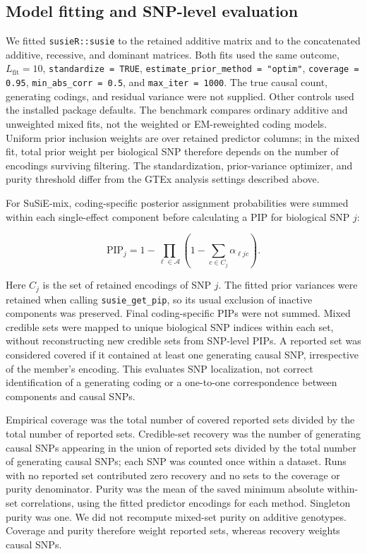 \documentclass[12pt]{article}
\begin{document}
\subsection{Model fitting and SNP-level evaluation}

We fitted \texttt{susieR::susie} to the retained additive matrix and to
the concatenated additive, recessive, and dominant matrices. Both fits
used the same outcome, $L_{\mathrm{fit}}=10$,
\texttt{standardize = TRUE}, \texttt{estimate\_prior\_method = "optim"},
\texttt{coverage = 0.95}, \texttt{min\_abs\_corr = 0.5}, and
\texttt{max\_iter = 1000}. The true causal count, generating codings,
and residual variance were not supplied. Other controls used the
installed package defaults. The benchmark compares ordinary additive
and unweighted mixed fits, not the weighted or EM-reweighted coding
models. Uniform prior inclusion weights are over retained predictor
columns; in the mixed fit, total prior weight per biological SNP
therefore depends on the number of encodings surviving filtering.
The standardization, prior-variance optimizer, and purity threshold
differ from the GTEx analysis settings described above.

For SuSiE-mix, coding-specific posterior assignment probabilities were
summed within each single-effect component before calculating a PIP
for biological SNP $j$:

\begin{equation}
\mathrm{PIP}_j=1-\prod_{\ell\in\mathcal{A}}
 \left(1-\sum_{c\in C_j}\alpha_{\ell jc}\right).
\end{equation}

Here $C_j$ is the set of retained encodings of SNP $j$. The fitted
prior variances were retained when calling \texttt{susie\_get\_pip},
so its usual exclusion of inactive components was preserved. Final
coding-specific PIPs were not summed. Mixed credible sets were mapped
to unique biological SNP indices within each set, without reconstructing
new credible sets from SNP-level PIPs. A reported set was considered
covered if it contained at least one generating causal SNP, irrespective
of the member's encoding. This evaluates SNP localization, not correct
identification of a generating coding or a one-to-one correspondence
between components and causal SNPs.

Empirical coverage was the total number of covered reported sets divided
by the total number of reported sets. Credible-set recovery was the
number of generating causal SNPs appearing in the union of reported
sets divided by the total number of generating causal SNPs; each SNP
was counted once within a dataset. Runs with no reported set contributed
zero recovery and no sets to the coverage or purity denominator. Purity
was the mean of the saved minimum absolute within-set correlations,
using the fitted predictor encodings for each method. Singleton purity
was one. We did not recompute mixed-set purity on additive genotypes.
Coverage and purity therefore weight reported sets, whereas recovery
weights causal SNPs.
\end{document}
